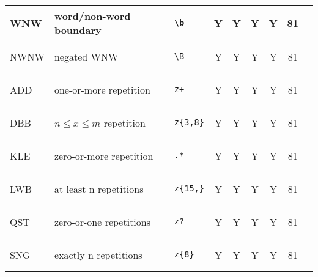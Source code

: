 \begin{xtabular}{lllcccccc}
\midrule
WNW & word/non-word boundary &
\begin{minipage}{0.5in}\begin{verbatim}
\b
\end{verbatim}\end{minipage} & Y & Y & Y & Y & 81\\
\midrule
NWNW & negated WNW &
\begin{minipage}{0.5in}\begin{verbatim}
\B
\end{verbatim}\end{minipage} & Y & Y & Y & Y & 81\\
\midrule
ADD & one-or-more repetition &
\begin{minipage}{0.5in}\begin{verbatim}
z+
\end{verbatim}\end{minipage} & Y & Y & Y & Y & 81\\
\midrule
DBB & $n\le x \le m$ repetition &
\begin{minipage}{0.5in}\begin{verbatim}
z{3,8}
\end{verbatim}\end{minipage} & Y & Y & Y & Y & 81\\
\midrule
KLE & zero-or-more repetition &
\begin{minipage}{0.5in}\begin{verbatim}
.*
\end{verbatim}\end{minipage} & Y & Y & Y & Y & 81\\
\midrule
LWB & at least n repetitions &
\begin{minipage}{0.5in}\begin{verbatim}
z{15,}
\end{verbatim}\end{minipage} & Y & Y & Y & Y & 81\\
\midrule
QST & zero-or-one repetitions &
\begin{minipage}{0.5in}\begin{verbatim}
z?
\end{verbatim}\end{minipage} & Y & Y & Y & Y & 81\\
\midrule
SNG & exactly n repetitions &
\begin{minipage}{0.5in}\begin{verbatim}
z{8}
\end{verbatim}\end{minipage} & Y & Y & Y & Y & 81\\

\end{xtabular}
